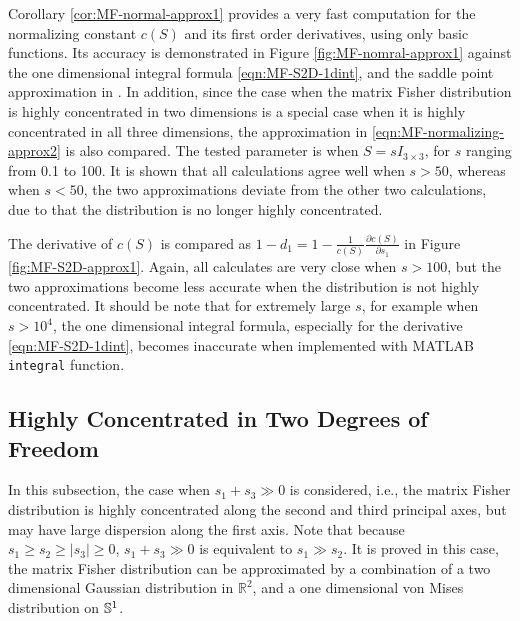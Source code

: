 Corollary \ref{cor:MF-normal-approx1} provides a very fast computation for the normalizing constant $c(S)$ and its first order derivatives, using only basic functions.
Its accuracy is demonstrated in Figure \ref{fig:MF-nomral-approx1} against the one dimensional integral formula \eqref{eqn:MF-S2D-1dint}, and the saddle point approximation in \cite{kume2005saddlepoint}.
In addition, since the case when the matrix Fisher distribution is highly concentrated in two dimensions is a special case when it is highly concentrated in all three dimensions, the approximation in \eqref{eqn:MF-normalizing-approx2} is also compared.
The tested parameter is when $S = sI_{3\times 3}$, for $s$ ranging from 0.1 to 100.
It is shown that all calculations agree well when $s > 50$, whereas when $s < 50$, the two approximations deviate from the other two calculations, due to that the distribution is no longer highly concentrated.

The derivative of $c(S)$ is compared as $1-d_1 = 1-\tfrac{1}{c(S)} \tfrac{\partial c(S)}{\partial s_1}$ in Figure \ref{fig:MF-S2D-approx1}.
Again, all calculates are very close when $s>100$, but the two approximations become less accurate when the distribution is not highly concentrated.
It should be note that for extremely large $s$, for example when $s > 10^4$, the one dimensional integral formula, especially for the derivative \ref{eqn:MF-S2D-1dint}, becomes inaccurate when implemented with MATLAB \texttt{integral} function.

\subsection{Highly Concentrated in Two Degrees of Freedom} \label{section:MF-approx-2}

In this subsection, the case when $s_1+s_3\gg 0$ is considered, i.e., the matrix Fisher distribution is highly concentrated along the second and third principal axes, but may have large dispersion along the first axis.
Note that because $s_1 \geq s_2 \geq |s_3| \geq 0$, $s_1+s_3\gg 0$ is equivalent to $s_1 \gg s_2$.
It is proved in this case, the matrix Fisher distribution can be approximated by a combination of a two dimensional Gaussian distribution in $\mathbb{R}^2$, and a one dimensional von Mises distribution on $\mathbb{S}^1$.

